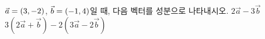 $\vec{a}=(3{,}\mkern3mu\mathopen{}-2)$, $\vec{b}=(-1{,}\mkern3mu\mathopen{}4)$일 때, 다음 벡터를 성분으로 나타내시오.
 $2\vec{a}-3\vec{b}$
 $3(2\vec{a}+\vec{b})-2(3\vec{a}-2\vec{b})$
